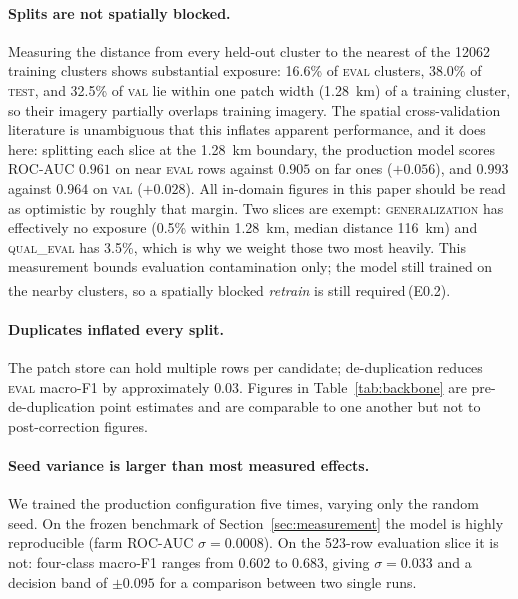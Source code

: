 \documentclass[11pt,a4paper]{article}
\newcommand{\unablated}[1]{\textsuperscript{\dag}\,(#1)}
\begin{document}
\paragraph{Splits are not spatially blocked.} Measuring the distance from every
held-out cluster to the nearest of the \num{12062} training clusters shows
substantial exposure: 16.6\% of \textsc{eval} clusters, 38.0\% of \textsc{test},
and 32.5\% of \textsc{val} lie within one patch width
(\SI{1.28}{\kilo\metre}) of a training cluster, so their imagery partially
overlaps training imagery. The spatial cross-validation literature
\citep{roberts2017spatialcv,ploton2020spatial} is unambiguous that this inflates
apparent performance, and it does here: splitting each slice at the
\SI{1.28}{\kilo\metre} boundary, the production model scores ROC-AUC $0.961$ on
near \textsc{eval} rows against $0.905$ on far ones ($+0.056$), and $0.993$
against $0.964$ on \textsc{val} ($+0.028$). All in-domain figures in this paper
should be read as optimistic by roughly that margin. Two slices are exempt:
\textsc{generalization} has effectively no exposure (0.5\% within
\SI{1.28}{\kilo\metre}, median distance \SI{116}{\kilo\metre}) and
\textsc{qual\_eval} has 3.5\%, which is why we weight those two most heavily.
This measurement bounds evaluation contamination only; the model still trained on
the nearby clusters, so a spatially blocked \emph{retrain} is still
required\unablated{E0.2}.

\paragraph{Duplicates inflated every split.} The patch store can hold multiple
rows per candidate; de-duplication reduces \textsc{eval} macro-F1 by
approximately $0.03$. Figures in Table~\ref{tab:backbone} are pre-de-duplication
point estimates and are comparable to one another but not to post-correction
figures.

\paragraph{Seed variance is larger than most measured effects.} We trained the
production configuration five times, varying only the random seed. On the frozen
benchmark of Section~\ref{sec:measurement} the model is highly reproducible
(farm ROC-AUC $\sigma = 0.0008$). On the 523-row evaluation slice it is not:
four-class macro-F1 ranges from $0.602$ to $0.683$, giving $\sigma = 0.033$ and a
decision band of $\pm0.095$ for a comparison between two single runs.
\end{document}
